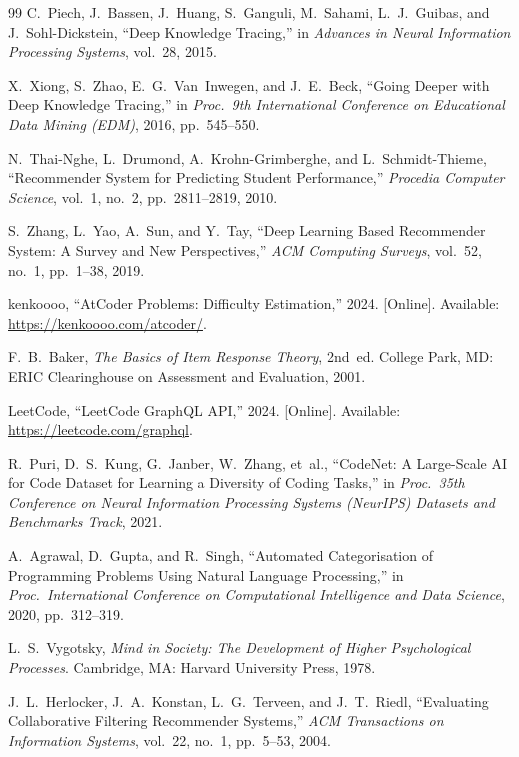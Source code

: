 \documentclass[12pt,a4paper]{article}
\begin{document}
\begin{thebibliography}{99}
C.~Piech, J.~Bassen, J.~Huang, S.~Ganguli, M.~Sahami, L.~J.~Guibas, and J.~Sohl-Dickstein, ``Deep Knowledge Tracing,'' in \emph{Advances in Neural Information Processing Systems}, vol.~28, 2015.

X.~Xiong, S.~Zhao, E.~G.~Van~Inwegen, and J.~E.~Beck, ``Going Deeper with Deep Knowledge Tracing,'' in \emph{Proc.\ 9th International Conference on Educational Data Mining (EDM)}, 2016, pp.~545--550.

N.~Thai-Nghe, L.~Drumond, A.~Krohn-Grimberghe, and L.~Schmidt-Thieme, ``Recommender System for Predicting Student Performance,'' \emph{Procedia Computer Science}, vol.~1, no.~2, pp.~2811--2819, 2010.

S.~Zhang, L.~Yao, A.~Sun, and Y.~Tay, ``Deep Learning Based Recommender System: A Survey and New Perspectives,'' \emph{ACM Computing Surveys}, vol.~52, no.~1, pp.~1--38, 2019.

kenkoooo, ``AtCoder Problems: Difficulty Estimation,'' 2024. [Online]. Available: \url{https://kenkoooo.com/atcoder/}.

F.~B.~Baker, \emph{The Basics of Item Response Theory}, 2nd~ed. College Park, MD: ERIC Clearinghouse on Assessment and Evaluation, 2001.

LeetCode, ``LeetCode GraphQL API,'' 2024. [Online]. Available: \url{https://leetcode.com/graphql}.

R.~Puri, D.~S.~Kung, G.~Janber, W.~Zhang, et~al., ``CodeNet: A Large-Scale AI for Code Dataset for Learning a Diversity of Coding Tasks,'' in \emph{Proc.\ 35th Conference on Neural Information Processing Systems (NeurIPS) Datasets and Benchmarks Track}, 2021.

A.~Agrawal, D.~Gupta, and R.~Singh, ``Automated Categorisation of Programming Problems Using Natural Language Processing,'' in \emph{Proc.\ International Conference on Computational Intelligence and Data Science}, 2020, pp.~312--319.

L.~S.~Vygotsky, \emph{Mind in Society: The Development of Higher Psychological Processes}. Cambridge, MA: Harvard University Press, 1978.

J.~L.~Herlocker, J.~A.~Konstan, L.~G.~Terveen, and J.~T.~Riedl, ``Evaluating Collaborative Filtering Recommender Systems,'' \emph{ACM Transactions on Information Systems}, vol.~22, no.~1, pp.~5--53, 2004.


\end{thebibliography}
\end{document}
